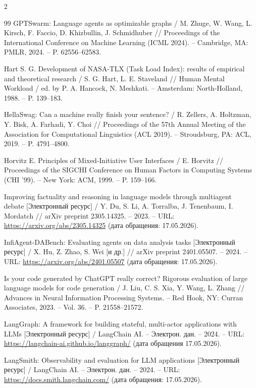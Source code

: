 \begin{multicols}{2}
\begin{thebibliography}{99}
GPTSwarm: Language agents as optimizable graphs / M. Zhuge,
W. Wang, L. Kirsch, F. Faccio, D. Khizbullin, J. Schmidhuber
// Proceedings of the International Conference on Machine
Learning (ICML 2024). -- Cambridge, MA: PMLR, 2024.
-- P. 62556--62583.

Hart S. G. Development of NASA-TLX (Task Load Index): results
of empirical and theoretical research / S. G. Hart,
L. E. Staveland // Human Mental Workload / ed. by P. A. Hancock,
N. Meshkati. -- Amsterdam: North-Holland, 1988. -- P. 139--183.

HellaSwag: Can a machine really finish your sentence?
/ R. Zellers, A. Holtzman, Y. Bisk, A. Farhadi, Y. Choi
// Proceedings of the 57th Annual Meeting of the Association
for Computational Linguistics (ACL 2019). -- Stroudsburg, PA:
ACL, 2019. -- P. 4791--4800.

Horvitz E. Principles of Mixed-Initiative User Interfaces
/ E. Horvitz // Proceedings of the SIGCHI Conference on Human
Factors in Computing Systems (CHI '99). -- New York: ACM, 1999.
-- P. 159--166.

Improving factuality and reasoning in language models through
multiagent debate [Электронный ресурс] / Y. Du, S. Li,
A. Torralba, J. Tenenbaum, I. Mordatch // arXiv preprint
2305.14325. -- 2023.
-- URL: \url{https://arxiv.org/abs/2305.14325} (дата обращения: 17.05.2026).

InfiAgent-DABench: Evaluating agents on data analysis tasks
[Электронный ресурс] / X. Hu, Z. Zhao, S. Wei [и др.]
// arXiv preprint 2401.05507. -- 2024.
-- URL: \url{https://arxiv.org/abs/2401.05507} (дата обращения: 17.05.2026).

Is your code generated by ChatGPT really correct? Rigorous
evaluation of large language models for code generation
/ J. Liu, C. S. Xia, Y. Wang, L. Zhang // Advances in Neural
Information Processing Systems. -- Red Hook, NY: Curran
Associates, 2023. -- Vol. 36. -- P. 21558--21572.

LangGraph: A framework for building stateful, multi-actor
applications with LLMs [Электронный ресурс] / LangChain AI.
-- Электрон. дан. -- 2024.
-- URL: \url{https://langchain-ai.github.io/langgraph/} (дата
обращения 17.05.2026).

LangSmith: Observability and evaluation for LLM applications
[Электронный ресурс] / LangChain AI. -- Электрон. дан. -- 2024.
-- URL: \url{https://docs.smith.langchain.com/} (дата обращения: 17.05.2026).


\end{thebibliography}
\end{multicols}
